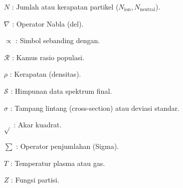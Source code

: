 \begin{itemize}
    \item[$N$] : Jumlah atau kerapatan partikel ($N_{\text{ion}}, N_{\text{neutral}}$).
    \item[$\nabla$] : Operator Nabla (del).
    \item[$\propto$] : Simbol sebanding dengan.
    \item[$\mathcal{R}$] : Kamus rasio populasi.
    \item[$\rho$] : Kerapatan (densitas).
    \item[$\mathcal{S}$] : Himpunan data spektrum final.
    \item[$\sigma$] : Tampang lintang (cross-section) atau deviasi standar.
    \item[$\sqrt{}$] : Akar kuadrat.
    \item[$\sum$] : Operator penjumlahan (Sigma).
    \item[$T$] : Temperatur plasma atau gas.
    \item[$Z$] : Fungsi partisi.
\end{itemize}
